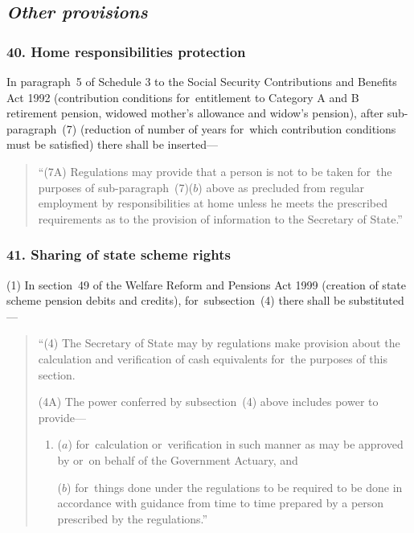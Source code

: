 \documentclass[12pt,a4paper]{article}
\begin{document}
\subsection{\itshape Other provisions}

\subsubsection{40. Home responsibilities protection}

In paragraph~5 of Schedule 3 to the Social Security Contributions and Benefits Act 1992 (contribution conditions for~entitlement to Category A and B retirement pension, widowed mother’s allowance and widow’s pension), after sub-paragraph~(7)  (reduction of number of years for~which contribution conditions must be satisfied) there shall be inserted—
\begin{quotation}
“(7A) Regulations may provide that a person is not to be taken for~the purposes of sub-paragraph~(7)($b$)  above as precluded from regular employment by responsibilities at home unless he meets the prescribed requirements as to the provision of information to the Secretary of State.”
\end{quotation}

\subsubsection{41. Sharing of state scheme rights}

(1) In section~49 of the Welfare Reform and Pensions Act 1999 (creation of state scheme pension debits and credits), for~subsection~(4)  there shall be substituted—
\begin{quotation}
“(4) The Secretary of State may by regulations make provision about the calculation and verification of cash equivalents for~the purposes of this section.

(4A) The power conferred by subsection~(4)  above includes power to provide—
\begin{enumerate}\item[]
($a$) for~calculation or~verification in such manner as may be approved by or~on behalf of the Government Actuary, and

($b$) for~things done under the regulations to be required to be done in accordance with guidance from time to time prepared by a person prescribed by the regulations.”
\end{enumerate}
\end{quotation}
\end{document}
